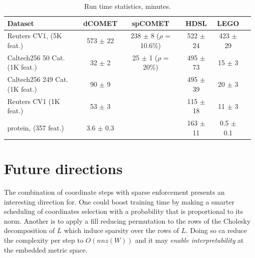 \documentclass[twoside,11pt]{article}
\newcommand\mat[1]{{#1}}
\newcommand{\W}{\mat{W}}
\begin{document}
\begin{table}[t]
\captionsetup{font=small}
\caption{Run time statistics, minutes.}
\label{runtimes}
\vskip 0.15in
\begin{center}
\begin{small}
\begin{sc}
\begin{tabular}{lccccr}
\hline
Dataset     & dCOMET           & spCOMET            & HDSL             & LEGO            \\ 
\hline
Reuters CV1, (5K feat.)&  573 $\pm$    22 &   238 $\pm$    8 ($\rho$ = 10.6\%) &522 $\pm$    24 &   423 $\pm$    29 & \\ 
Caltech256 50 Cat. (1K feat.)  &    32 $\pm$     2 &        25 $\pm$  1 ($\rho$ = 20\%)     &   495 $\pm$    73 &     15 $\pm$     3 &\\ 
Caltech256 249 Cat. (1K feat.) &   90 $\pm$     9 &                  &  495 $\pm$    39  &     20 $\pm$     3 &\\
Reuters CV1 (1K feat.) &   53 $\pm$     3 &                  &   115 $\pm$    18 &     11 $\pm$     3 &\\ 
protein, (357 feat.)  &    3.6 $\pm$     0.3 &                  &   163 $\pm$    11 &      0.5 $\pm$     0.1 &\\ 
\hline
\end{tabular}
\end{sc}
\end{small}
\end{center}
\vskip -0.1in
\end{table}

\section{Future directions}

The combination of coordinate steps with sparse enforcement presents an interesting direction for. One could boost training time by  making a smarter scheduling of coordinates selection with a probability that is proportional to its norm. Another is to apply a fill reducing permutation to the rows of the Cholesky decomposition of $L$ which induce sparsity over the rows of $L$. Doing so ca reduce the complexity per step to $O(nnz(\W))$ and it may \emph{enable interpretability} at the embedded metric space.    
\end{document}
